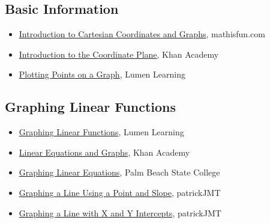 \subsection{Basic Information}
\label{sss:basi-3d10}




\begin{itemize}
    \item \href{https://www.mathsisfun.com/data/cartesian-coordinates.html}{Introduction to Cartesian Coordinates and Graphs}, mathisfun.com
    \item \href{https://www.khanacademy.org/math/algebra/x2f8bb11595b61c86:foundation-algebra/x2f8bb11595b61c86:algebra-overview-history/v/descartes-and-cartesian-coordinates}{Introduction to the Coordinate Plane}, Khan Academy
    \item \href{https://courses.lumenlearning.com/ivytech-collegealgebra/chapter/plotting-ordered-pairs-in-the-cartesian-coordinate-system/}{Plotting Points on a Graph}, Lumen Learning
\end{itemize}


\subsection{Graphing Linear Functions}
\label{sss:grap-b612}




\begin{itemize}
    \item \href{https://courses.lumenlearning.com/waymakercollegealgebra/chapter/graph-linear-functions/}{Graphing Linear Functions}, Lumen Learning
    \item \href{https://www.khanacademy.org/math/algebra/x2f8bb11595b61c86:linear-equations-graphs}{Linear Equations and Graphs}, Khan Academy
    \item \href{https://www.palmbeachstate.edu/prepmathlw/Documents/graphing\%20linear\%20equations.pdf}{Graphing Linear Equations}, Palm Beach State College
    \item \href{https://www.youtube.com/watch?v=lkRyxnqOb8M}{Graphing a Line Using a Point and Slope}, patrickJMT
    \item \href{https://www.youtube.com/watch?v=mxBoni8N70Y}{Graphing a Line with X and Y Intercepts}, patrickJMT
\end{itemize}



